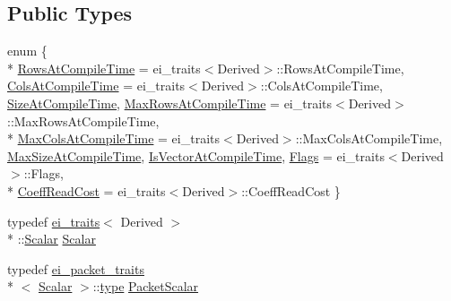 \subsection*{Public Types}
\begin{DoxyCompactItemize}
\item 
enum \{ \\*
\hyperlink{class_matrix_base_aaa53a8ec1bc1ba52b1e50631dac15d6da10c48c1361376cbd5ef62a18966f2691}{Rows\-At\-Compile\-Time} = ei\-\_\-traits$<$Derived$>$\-:\-:Rows\-At\-Compile\-Time, 
\hyperlink{class_matrix_base_aaa53a8ec1bc1ba52b1e50631dac15d6da359babfd1277ae780433d99b383e00e8}{Cols\-At\-Compile\-Time} = ei\-\_\-traits$<$Derived$>$\-:\-:Cols\-At\-Compile\-Time, 
\hyperlink{class_matrix_base_aaa53a8ec1bc1ba52b1e50631dac15d6da74e612bdee777aa1924cbd37b5e298a4}{Size\-At\-Compile\-Time}, 
\hyperlink{class_matrix_base_aaa53a8ec1bc1ba52b1e50631dac15d6da73ed130d060f18903c34624ccb8c9894}{Max\-Rows\-At\-Compile\-Time} = ei\-\_\-traits$<$Derived$>$\-:\-:Max\-Rows\-At\-Compile\-Time, 
\\*
\hyperlink{class_matrix_base_aaa53a8ec1bc1ba52b1e50631dac15d6da3e5f3bde791fd2f758a9f757e046b2ef}{Max\-Cols\-At\-Compile\-Time} = ei\-\_\-traits$<$Derived$>$\-:\-:Max\-Cols\-At\-Compile\-Time, 
\hyperlink{class_matrix_base_aaa53a8ec1bc1ba52b1e50631dac15d6da15fbad694bf6920ef57fabc0cb3e56ea}{Max\-Size\-At\-Compile\-Time}, 
\hyperlink{class_matrix_base_aaa53a8ec1bc1ba52b1e50631dac15d6da89bd68fc43a372f1b3e0038d16397d8f}{Is\-Vector\-At\-Compile\-Time}, 
\hyperlink{class_matrix_base_aaa53a8ec1bc1ba52b1e50631dac15d6da93aaf6d335b45cee8730ee9ebdef6f33}{Flags} = ei\-\_\-traits$<$Derived$>$\-:\-:Flags, 
\\*
\hyperlink{class_matrix_base_aaa53a8ec1bc1ba52b1e50631dac15d6da9b78e19bdb6cc34bcff3a4ccef118291}{Coeff\-Read\-Cost} = ei\-\_\-traits$<$Derived$>$\-:\-:Coeff\-Read\-Cost
 \}
\item 
typedef \hyperlink{structei__traits}{ei\-\_\-traits}$<$ Derived $>$\\*
\-::\hyperlink{class_matrix_base_a625df8339dc2d816cbc0fd66e7dadaf5}{Scalar} \hyperlink{class_matrix_base_a625df8339dc2d816cbc0fd66e7dadaf5}{Scalar}
\item 
typedef \hyperlink{structei__packet__traits}{ei\-\_\-packet\-\_\-traits}\\*
$<$ \hyperlink{class_matrix_base_a625df8339dc2d816cbc0fd66e7dadaf5}{Scalar} $>$\-::\hyperlink{glext_8h_a7d05960f4f1c1b11f3177dc963a45d86}{type} \hyperlink{class_matrix_base_a58f32cd6a06433ee7a60efa03e99183a}{Packet\-Scalar}
\item 

\end{DoxyCompactItemize}
